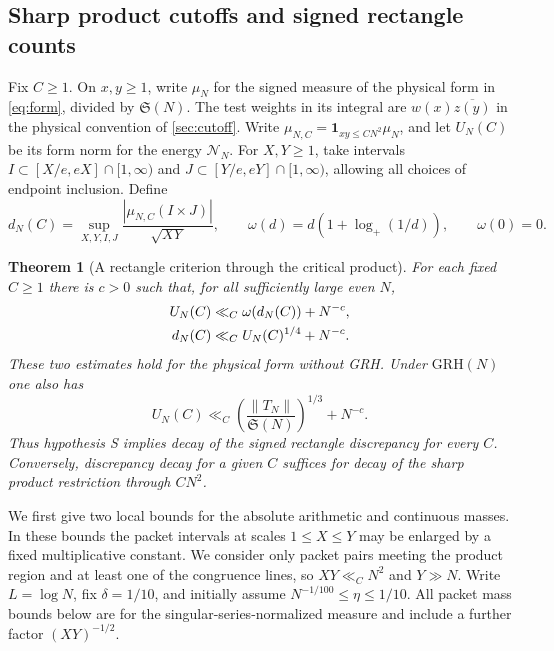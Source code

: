 \documentclass[11pt,a4paper]{article}
\numberwithin{equation}{section}
\newtheorem{theorem}{Theorem}[section]
\newcommand{\SSS}{\mathfrak S}
\newcommand{\grh}{\mathrm{GRH}}
\newcommand{\NN}{\mathcal N_N}
\begin{document}
\subsection{Sharp product cutoffs and signed rectangle counts}

Fix $C\ge1$. On $x,y\ge1$, write $\mu_N$ for the signed measure
of the physical form in \cref{eq:form}, divided by $\SSS(N)$.
The test weights in its integral are $w(x)\overline{z(y)}$ in
the physical convention of \cref{sec:cutoff}.
Write $\mu_{N,C}=\mathbf1_{xy\le CN^2}\mu_N$,
and let $U_N(C)$ be its form norm for the energy $\NN$.
For $X,Y\ge1$, take intervals $I\subset [X/e,eX]\cap[1,\infty)$
and $J\subset[Y/e,eY]\cap[1,\infty)$, allowing all choices of
endpoint inclusion. Define
\[
 d_N(C)=\sup_{X,Y,I,J}\frac{|\mu_{N,C}(I\times J)|}{\sqrt{XY}},
 \qquad
 \omega(d)=d(1+\log_+(1/d)),\qquad \omega(0)=0 .
\]

\begin{theorem}[A rectangle criterion through the critical product]
\label{thm:criticaldiscrepancy}
For each fixed $C\ge1$ there is $c>0$ such that, for all sufficiently
large even $N$,
\begin{align}
 U_N(C)&\ll_C \omega(d_N(C))+N^{-c}, \notag\\
 d_N(C)&\ll_C U_N(C)^{1/4}+N^{-c}.
 \label{eq:criticaldiscrepancy}
\end{align}
These two estimates hold for the physical form without GRH.
Under $\grh(N)$ one also has
\begin{equation}
 U_N(C)\ll_C \left(\frac{\|T_N\|}{\SSS(N)}\right)^{1/3}
                    +N^{-c}.
 \label{eq:criticalfullrestriction}
\end{equation}
Thus hypothesis S implies decay of the signed rectangle
discrepancy for every $C$. Conversely, discrepancy decay for a
given $C$ suffices for decay of the sharp product restriction
through $CN^2$.
\end{theorem}

We first give two local bounds for the absolute arithmetic and
continuous masses. In these bounds the packet intervals at scales
$1\le X\le Y$ may be enlarged by a fixed multiplicative constant.
We consider only packet pairs meeting the product region and at
least one of the congruence lines, so $XY\ll_C N^2$ and $Y\gg N$.
Write $L=\log N$, fix $\delta=1/10$, and initially assume
$N^{-1/100}\le\eta\le1/10$. All packet mass bounds below are
for the singular-series-normalized measure and include a
further factor $(XY)^{-1/2}$.
\end{document}
